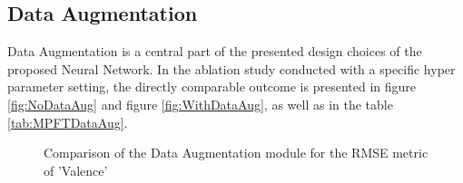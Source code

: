 \subsection{Data Augmentation}
Data Augmentation is a central part of the presented design choices of the proposed Neural Network. In the ablation study conducted with a specific hyper parameter setting, the directly comparable outcome is presented in figure \ref{fig:NoDataAug} and figure \ref{fig:WithDataAug}, as well as in the table \ref{tab:MPFTDataAug}.

\begin{figure}[H]
  \centering
  \hfill
  \caption{Comparison of the Data Augmentation module for the RMSE metric of 'Valence'}
\end{figure}


